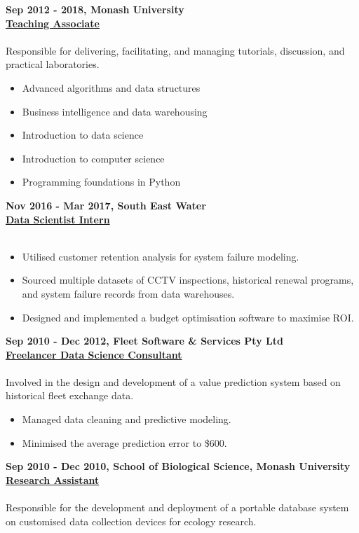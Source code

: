 \documentclass[a4paper,8pt,final]{memoir}
\newcommand{\Sep}{\vspace{1.5em}}
\newcommand{\CVItem}[1]
	{\textbf{\color{RoyalBlue} #1}}
\begin{document}
\clearpage
\framebreak
\framebreak

\CVItem{Sep 2012 - 2018, Monash University}\\
\underline{\textbf{Teaching Associate}}\\
\\
Responsible for delivering, facilitating, and managing tutorials, discussion, and practical laboratories.
    \begin{itemize}
        \item Advanced algorithms and data structures
        \item Business intelligence and data warehousing
        \item Introduction to data science
        \item Introduction to computer science
        \item Programming foundations in Python
    \end{itemize}
\Sep


\CVItem{Nov 2016 - Mar 2017, South East Water}\\
\underline{\textbf{Data Scientist Intern}}\\
\\
    \begin{itemize}
        \item Utilised customer retention analysis for system failure modeling.
        \item Sourced multiple datasets of CCTV inspections, historical renewal programs, and system failure records from data warehouses.
        \item Designed and implemented a budget optimisation software to maximise ROI.
    \end{itemize}
\Sep

\CVItem{Sep 2010 - Dec 2012, Fleet Software \& Services Pty Ltd}\\
\underline{\textbf{Freelancer Data Science Consultant}}\\
\\
Involved in the design and development of a value prediction system based on historical fleet exchange data.
    \begin{itemize}
        \item Managed data cleaning and predictive modeling.
        \item Minimised the average prediction error to \$600.
    \end{itemize}
\Sep

\CVItem{Sep 2010 - Dec 2010, School of Biological Science, Monash University}\\
\underline{\textbf{Research Assistant}}\\
\\
Responsible for the development and deployment of a portable database system on customised data collection devices for ecology research.
\Sep
\end{document}
